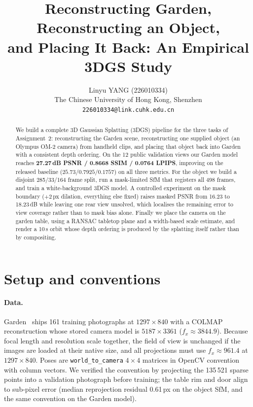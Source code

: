 \documentclass[10pt,twocolumn,letterpaper]{article}
\title{Reconstructing Garden, Reconstructing an Object,\\and Placing It Back: An Empirical 3DGS Study}
\author{Linyu YANG (226010334)\\
The Chinese University of Hong Kong, Shenzhen\\
\tt\small 226010334@link.cuhk.edu.cn}
\begin{document}
\maketitle

\begin{abstract}
We build a complete 3D Gaussian Splatting (3DGS) pipeline for the three tasks of Assignment~2:
reconstructing the Garden scene, reconstructing one supplied object (an Olympus OM-2 camera)
from handheld clips, and placing that object back into Garden with a consistent depth ordering.
On the 12 public validation views our Garden model reaches \textbf{27.27\,dB PSNR / 0.8668 SSIM /
0.0764 LPIPS}, improving on the released baseline ($25.73 / 0.7925 / 0.1757$) on all three
metrics. For the object we build a disjoint 285/33/164 frame split, run a mask-limited SfM
that registers all 498 frames, and train a white-background 3DGS model. A controlled experiment
on the mask boundary ($+2$\,px dilation, everything else fixed) raises masked PSNR from
16.23 to 18.23\,dB while leaving one rear view unsolved, which localises the remaining error to
view coverage rather than to mask bias alone. Finally we place the camera on the garden table,
using a RANSAC tabletop plane and a width-based scale estimate, and render a 10\,s orbit whose
depth ordering is produced by the splatting itself rather than by compositing.
\end{abstract}

\section{Setup and conventions}

\paragraph{Data.} Garden~\cite{barron2022} ships 161 training photographs at $1297\times840$ with a COLMAP
reconstruction whose stored camera model is $5187\times3361$ ($f_x\!\approx\!3844.9$).
Because focal length and resolution scale together, the field of view is unchanged if the images
are loaded at their native size, and all projections must use $f_x\!\approx\!961.4$ at
$1297\times840$. Poses are \texttt{world\_to\_camera} $4\times4$ matrices in OpenCV convention
with column vectors. We verified the convention by projecting the 135\,521 sparse points into a
validation photograph before training; the table rim and door align to sub-pixel error
(median reprojection residual 0.61\,px on the object SfM, and the same convention on the Garden
model).
\end{document}
